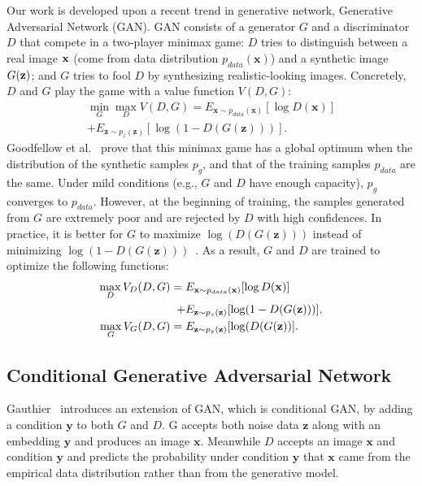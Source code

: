 \documentclass[10pt,twocolumn,letterpaper]{article}
\begin{document}
Our work is developed upon a recent trend in generative network, Generative Adversarial Network (GAN). GAN consists of a generator $G$ and a discriminator $D$ that compete in a two-player
minimax game: $D$ tries to distinguish between a real image $\bf{x}$ (come from data distribution $p_{data}(\mathbf{x})$) and a synthetic image $G(\bf{z})$; and $G$ tries to fool $D$ by synthesizing realistic-looking images. 
Concretely, $D$ and $G$ play the game with a value function $V(D,G)$:
\vspace{-1mm}
\begin{align}
\min_{G} \max_{D} V(D,G) =  E_{\mathbf{x} \sim p_{data}(\mathbf{x})} [\log D(\mathbf{x})] \nonumber \\ 
+  E_{\mathbf{z} \sim p_{z}(\mathbf{z})} [\log(1- D(G(\mathbf{z}))) ].
\end{align}
Goodfellow et al.~\cite{goodfellow2014generative} prove that this minimax game has
a global optimum when the distribution of the synthetic samples $p_{g}$, and that of the training samples $p_{data}$ are the same. 
Under mild conditions (e.g., $G$ and $D$ have enough capacity), $p_{g}$ converges to $p_{data}$. 
However, at the beginning of training, the samples generated from $G$ are extremely poor and are rejected by $D$ with high confidences. 
In practice, it is better for $G$ to maximize $\log(D(G(\mathbf{z})))$ instead of minimizing $\log \left( 1 - D(G(\mathbf{z})) \right)$~\cite{goodfellow2014generative}. 
As a result, $G$ and $D$ are trained to optimize the following functions:
\begin{align}
\max_{D} V_D(D,G) = {} & E_{\mathbf{x} \sim p_{data}(\mathbf{x})} [\log D({\bf{x}})] \nonumber \\ 
+ & E_{\mathbf{z} \sim p_{z}(\mathbf{z})} [\log(1- D(G(\mathbf{z}))) ], \\
\max_{G} V_G(D,G) = {} & E_{\mathbf{z} \sim p_{z}(\mathbf{z})} [\log(D(G(\mathbf{z})) ].
\end{align}

\subsection{Conditional Generative Adversarial Network} 
Gauthier~\cite{gauthier2014conditional} introduces an extension of GAN, which is conditional GAN, by adding a condition $\mathbf{y}$ to both $G$ and $D$. G accepts both noise data $\mathbf{z}$ along with an embedding $\mathbf{y}$ and produces an image $\mathbf{x}$. Meanwhile $D$ accepts an image $\mathbf{x}$ and condition $\mathbf{y}$ and predicts the probability under condition $\mathbf{y}$ that $\mathbf{x}$ came from the empirical data distribution rather than from the generative model.
\end{document}
